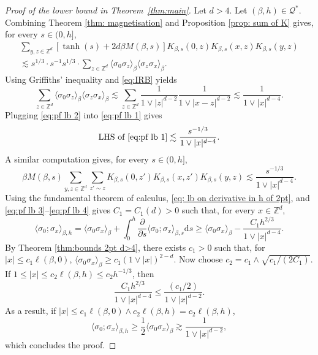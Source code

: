 \documentclass[11pt,a4paper]{article}
\numberwithin{equation}{section}
\theoremstyle{plain}
\theoremstyle{definition}
\begin{document}
\begin{proof}[Proof of the lower bound in Theorem~\textup{\ref{thm:main}}] Let $d>4$. Let $(\beta,h)\in \mathcal Q^*$. Combining Theorem \ref{thm: magnetisation} and Proposition \ref{prop: sum of K} gives, for every $s\in (0,h]$,
\begin{multline}\label{eq:pf lb 1}
	\sum_{y,z\in \mathbb Z^d}[\tanh(s)+2d\beta M(\beta,s)]K_{\beta,s}(0,z)K_{\beta,s}(x,z)K_{\beta,s}(y,z)\\\lesssim s^{1/3}\cdot s^{-1}s^{1/3} \cdot \sum_{z\in \mathbb Z^d}\langle \sigma_0\sigma_z\rangle_{\beta}\langle \sigma_z\sigma_x\rangle_{\beta}.
\end{multline}
Using Griffiths' inequality and \eqref{eq:IRB} yields
\begin{equation}\label{eq:pf lb 2}
	\sum_{z\in \mathbb Z^d}\langle \sigma_0\sigma_z\rangle_{\beta}\langle \sigma_z\sigma_x\rangle_{\beta}\lesssim \sum_{z\in \mathbb Z^d}\frac{1}{1\vee |z|^{d-2}}\frac{1}{1\vee |x-z|^{d-2}}\lesssim \frac{1}{1\vee |x|^{d-4}}.
\end{equation}
Plugging \eqref{eq:pf lb 2} into \eqref{eq:pf lb 1} gives
\begin{equation}\label{eq:pf lb 3}
	\textup{LHS of \eqref{eq:pf lb 1}}\lesssim \frac{s^{-1/3}}{1\vee |x|^{d-4}}. 
\end{equation}
A similar computation gives, for every $s\in(0,h]$,
\begin{equation}\label{eq:pf lb 4}
	\beta M(\beta,s)\sum_{y,z\in \mathbb Z^d}\sum_{z'\sim z}K_{\beta,s}(0,z')K_{\beta,s}(x,z')K_{\beta,s}(y,z)\lesssim \frac{s^{-1/3}}{1\vee |x|^{d-4}}.
\end{equation}
Using the fundamental theorem of calculus, \eqref{eq: lb on derivative in h of 2pt}, and \eqref{eq:pf lb 3}--\eqref{eq:pf lb 4} gives $C_1=C_1(d)>0$ such that, for every $x\in \mathbb Z^d$,
\begin{equation}\label{eq:pf lb 5}
	\langle \sigma_0;\sigma_x\rangle_{\beta,h}=\langle \sigma_0\sigma_x\rangle_\beta+\int_0^h \frac{\partial}{\partial s}\langle \sigma_0;\sigma_x\rangle_{\beta,s}\mathrm{d}s\geq \langle \sigma_0\sigma_x\rangle_{\beta}-\frac{C_1 h^{2/3}}{1\vee |x|^{d-4}}.
\end{equation}
By Theorem \ref{thm:bounds 2pt d>4}, there exists $c_1>0$ such that, for $|x|\leq c_1\ell(\beta,0)$, $\langle \sigma_0\sigma_x\rangle_{\beta}\geq c_1(1\vee |x|)^{2-d}$. Now choose $c_2= c_1\wedge\sqrt{c_1/(2C_1)}$. If $1\leq |x|\leq c_2\ell(\beta,h)\leq c_2h^{-1/3}$, then
\begin{equation}
	\frac{C_1 h^{2/3}}{1\vee |x|^{d-4}}\leq \frac{(c_1/2)}{1\vee |x|^{d-2}}.
\end{equation}
As a result, if $|x|\leq c_1\ell(\beta,0)\wedge c_2\ell(\beta,h)=c_2\ell(\beta,h)$,
\begin{equation}
	\langle \sigma_0;\sigma_x\rangle_{\beta,h}\geq \frac{1}{2}\langle \sigma_0\sigma_x\rangle_{\beta}\gtrsim \frac{1}{1\vee |x|^{d-2}},
\end{equation}
which concludes the proof.
\end{proof}
\end{document}
